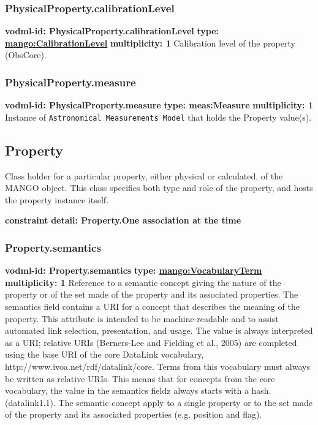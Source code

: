     \subsubsection{PhysicalProperty.calibrationLevel}
      \textbf{vodml-id: PhysicalProperty.calibrationLevel} \newline
      \textbf{type: \hyperref[sect:CalibrationLevel]{mango:CalibrationLevel}} \newline
      \textbf{multiplicity: 1} \newline 
      Calibration level of the property (ObsCore).

    \subsubsection{PhysicalProperty.measure}
      \textbf{vodml-id: PhysicalProperty.measure} \newline
      \textbf{type: meas:Measure} \newline
      \textbf{multiplicity: 1} \newline 
      Instance of \texttt{Astronomical Measurements Model} that holds the Property value(s).

  \subsection{Property}
  \label{sect:Property}
    Class holder for a particular property, either physical or calculated, of the MANGO object. This class specifies both type and role of the property, and hosts the property instance itself.

    \noindent \textbf{constraint} \newline
    \indent    \textbf{detail: Property.One association at the time
 }\newline


    \subsubsection{Property.semantics}
      \textbf{vodml-id: Property.semantics} \newline
      \textbf{type: \hyperref[sect:VocabularyTerm]{mango:VocabularyTerm}} \newline
      \textbf{multiplicity: 1} \newline 
      Reference to a semantic concept giving the nature of the property or of the set made of the property and its associated properties. The semantics field contains a URI for a concept that describes the meaning of the property. This attribute is intended to be machine-readable and to assist automated link selection, presentation, and usage. The value is always interpreted as a URI; relative URIs (Berners-Lee and Fielding et al., 2005) are completed using the base URI of the core DataLink vocabulary, http://www.ivoa.net/rdf/datalink/core. Terms from this vocabulary must always be written as relative URIs. This means that for concepts from the core vocabulary, the value in the semantics fieldz always starts with a hash. (datalink1.1). The semantic concept apply to a single property or to the set made of the property and its associated properties (e.g. position and flag).

